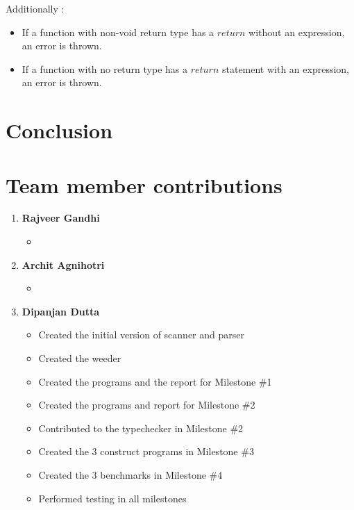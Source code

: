 \documentclass[a4paper]{article}
\begin{document}
Additionally : 
\begin{itemize}
\item If a function with non-void return type has a $return$ without an expression, an error is thrown.
\item If a function with no return type has a $return$ statement with an expression, an error is thrown.
\end{itemize}

\section{Conclusion}

\section{Team member contributions}

\begin{enumerate}
	\item \textbf{Rajveer Gandhi}
    \begin{itemize}
    	\item 
    \end{itemize}
    \item \textbf{Archit Agnihotri}
    \begin{itemize}
    	\item 
    \end{itemize}
    \item \textbf{Dipanjan Dutta}
    \begin{itemize}
    	\item Created the initial version of scanner and parser
        \item Created the weeder
        \item Created the programs and the report for Milestone \#1
        \item Created the programs and report for Milestone \#2
        \item Contributed to the typechecker in Milestone \#2
        \item Created the 3 construct programs in Milestone \#3
        \item Created the 3 benchmarks in Milestone \#4
        \item Performed testing in all milestones
    \end{itemize}
\end{enumerate}
\end{document}
